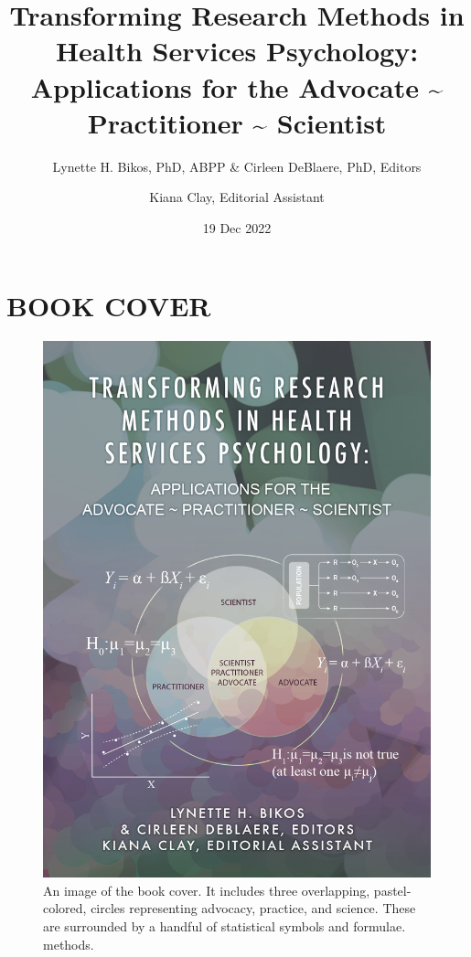 \documentclass[
  11pt,
]{book}
\title{Transforming Research Methods in Health Services Psychology: Applications for the Advocate \textasciitilde{} Practitioner \textasciitilde{} Scientist}
\author{Lynette H. Bikos, PhD, ABPP \& Cirleen DeBlaere, PhD, Editors \and Kiana Clay, Editorial Assistant}
\date{19 Dec 2022}
\begin{document}
\maketitle

{
\hypersetup{linkcolor=}
\setcounter{tocdepth}{3}
\tableofcontents
}
\hypertarget{book-cover}{%
\chapter*{BOOK COVER}\label{book-cover}}

\begin{figure}
\centering
\includegraphics{images/bookcover.png}
\caption{An image of the book cover. It includes three overlapping, pastel-colored, circles representing advocacy, practice, and science. These are surrounded by a handful of statistical symbols and formulae. methods.}
\end{figure}
\end{document}
